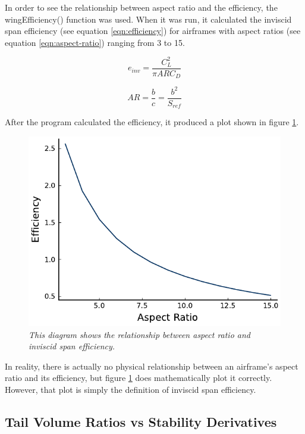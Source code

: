\documentclass{journal}
\begin{document}
	In order to see the relationship between aspect ratio and the efficiency, the wingEfficiency() function was used. When it was run, it calculated the inviscid span efficiency (see equation \ref{eqn:efficiency}) for airframes with aspect ratios (see equation \ref{eqn:aspect-ratio}) ranging from 3 to 15.
	
	\begin{equation}
		e_{inv} = \frac{C_L^2}{\pi{ARC_D}}
		\label{eqn:efficiency}
	\end{equation}

	\begin{equation}
		AR = \frac{b}{c} = \frac{b^2}{S_{ref}}
		\label{eqn:aspect-ratio}
	\end{equation}
	
	After the program calculated the efficiency, it produced a plot shown in figure \ref{fig:efficiency}. \\
	
	\begin{figure}[H]
		\centering
		\includegraphics{../graphics/efficiency.pdf}
		\caption{\emph{This diagram shows the relationship between aspect ratio and inviscid span efficiency.}}
		\label{fig:efficiency}
	\end{figure}

	In reality, there is actually no physical relationship between an airframe's aspect ratio and its efficiency, but figure \ref{fig:efficiency} does mathematically plot it correctly. However, that plot is simply the definition of inviscid span efficiency. \\
	
	\subsection{Tail Volume Ratios vs Stability Derivatives}
	
\end{document}
